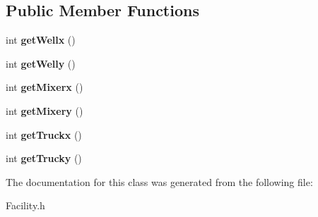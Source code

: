 \subsection*{Public Member Functions}
\begin{DoxyCompactItemize}
\item 
\mbox{\label{classFacility_a3ea333f9396bfd7a99072b15297562fa}} 
int {\bfseries get\+Wellx} ()
\item 
\mbox{\label{classFacility_acec600b9994427ff3cc44489bb278524}} 
int {\bfseries get\+Welly} ()
\item 
\mbox{\label{classFacility_a5b69cd456d503f8b388b48d55ed4454d}} 
int {\bfseries get\+Mixerx} ()
\item 
\mbox{\label{classFacility_aeb8f22d0d1e38f66e21226916e738793}} 
int {\bfseries get\+Mixery} ()
\item 
\mbox{\label{classFacility_a2c1759e99667330b867e27c05458a142}} 
int {\bfseries get\+Truckx} ()
\item 
\mbox{\label{classFacility_af3ed5c9f49fb522032e76d699efe2211}} 
int {\bfseries get\+Trucky} ()
\end{DoxyCompactItemize}


The documentation for this class was generated from the following file\+:\begin{DoxyCompactItemize}
\item 
Facility.\+h\end{DoxyCompactItemize}
